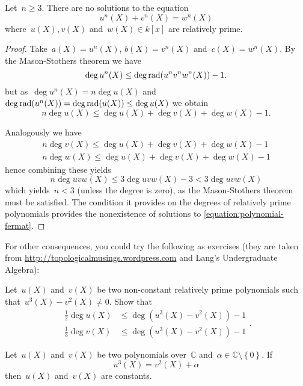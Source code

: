 \begin{theorem}
  \label{theorem:polynomial-fermat}
  Let~$n\geq 3$. There are no solutions to the equation
  \begin{equation}
    u^n(X)+v^n(X)=w^n(X)
    \label{equation:polynomial-fermat}
  \end{equation}
  where~$u(X),v(X)$ and~$w(X)\in k[x]$ are relatively prime.

  \begin{proof}
    Take~$a(X)=u^n(X)$, $b(X)=v^n(X)$ and~$c(X)=w^n(X)$. By the Mason-Stothers theorem we have
    \begin{equation}
      \deg u^n(X)\leq\deg\operatorname{rad}(u^nv^nw^n(X))-1.
    \end{equation}
    but as~$\deg u^n(X)=n\deg u(X)$ and~$\deg\operatorname{rad}(u^n(X))=\deg\operatorname{rad}(u(X))\leq\deg u(X)$ we obtain
    \begin{equation}
      n\deg u(X)\leq\deg u(X)+\deg v(X)+\deg w(X)-1.
    \end{equation}

    Analogously we have
    \begin{equation}
      \begin{gathered}
        n\deg v(X)\leq\deg u(X)+\deg v(X)+\deg w(X)-1 \\
        n\deg w(X)\leq\deg u(X)+\deg v(X)+\deg w(X)-1
      \end{gathered}
    \end{equation}
    hence combining these yields
    \begin{equation}
      n\deg uvw(X)\leq 3\deg uvw(X)-3<3\deg uvw(X)
    \end{equation}
    which yields~$n<3$ (unless the degree is zero), as the Mason-Stothers theorem must be satisfied. The condition it provides on the degrees of relatively prime polynomials provides the nonexistence of solutions to \eqref{equation:polynomial-fermat}.
  \end{proof}
\end{theorem}

For other consequences, you could try the following as exercises (they are taken from \url{http://topologicalmusings.wordpress.com} and Lang's Undergraduate Algebra):

\begin{theorem}
  Let~$u(X)$ and~$v(X)$ be two non-constant relatively prime polynomials such that~$u^3(X)-v^2(X)\neq 0$. Show that
  \begin{equation}
    \begin{aligned}
      \frac{1}{2}\deg u(X)&\leq\deg(u^3(X)-v^2(X))-1 \\
      \frac{1}{3}\deg v(X)&\leq\deg(u^3(X)-v^2(X))-1
    \end{aligned}.
  \end{equation}
\end{theorem}

\begin{theorem}
  Let~$u(X)$ and~$v(X)$ be two polynomials over~$\mathbb{C}$ and~$\alpha\in\mathbb{C}\setminus\left\{ 0 \right\}$. If
  \begin{equation}
    u^3(X)=v^2(X)+\alpha
  \end{equation}
  then~$u(X)$ and~$v(X)$ are constants.
\end{theorem}
